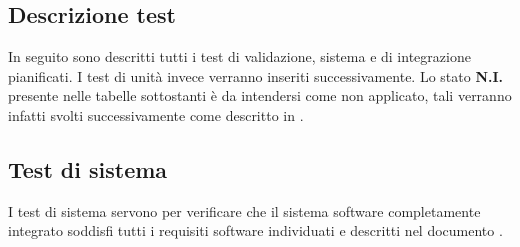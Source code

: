 	\subsection{Descrizione test}
		In seguito sono descritti tutti i test di validazione, sistema e di integrazione pianificati. I test di unità invece verranno inseriti successivamente.
Lo stato \textbf{N.I.} presente nelle tabelle sottostanti è da intendersi come non applicato, tali verranno infatti svolti successivamente come descritto in \docNamePdP.

	\subsection{Test di sistema}
		I test di sistema servono per verificare che il sistema software completamente integrato soddisfi tutti i requisiti software individuati e descritti nel documento \docNameVersionAdR.
